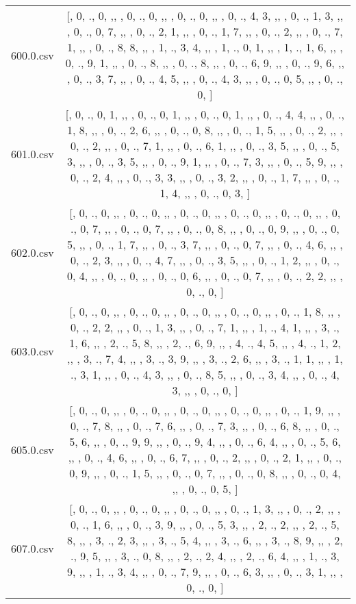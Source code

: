 \begin{table}[ht]
\begin{tabular}{@{}c c@{}}
	600.0.csv & [, 0, ., 0, ,,  , 0, ., 0, ,,  , 0, ., 0, ,,  , 0, ., 4, 3, ,,  , 0, ., 1, 3, ,,  , 0, ., 0, 7, ,,  , 0, ., 2, 1, ,,  , 0, ., 1, 7, ,,  , 0, ., 2, ,,  , 0, ., 7, 1, ,,  , 0, ., 8, 8, ,,  , 1, ., 3, 4, ,,  , 1, ., 0, 1, ,,  , 1, ., 1, 6, ,,  , 0, ., 9, 1, ,,  , 0, ., 8, ,,  , 0, ., 8, ,,  , 0, ., 6, 9, ,,  , 0, ., 9, 6, ,,  , 0, ., 3, 7, ,,  , 0, ., 4, 5, ,,  , 0, ., 4, 3, ,,  , 0, ., 0, 5, ,,  , 0, ., 0, ]\\ 
	601.0.csv & [, 0, ., 0, 1, ,,  , 0, ., 0, 1, ,,  , 0, ., 0, 1, ,,  , 0, ., 4, 4, ,,  , 0, ., 1, 8, ,,  , 0, ., 2, 6, ,,  , 0, ., 0, 8, ,,  , 0, ., 1, 5, ,,  , 0, ., 2, ,,  , 0, ., 2, ,,  , 0, ., 7, 1, ,,  , 0, ., 6, 1, ,,  , 0, ., 3, 5, ,,  , 0, ., 5, 3, ,,  , 0, ., 3, 5, ,,  , 0, ., 9, 1, ,,  , 0, ., 7, 3, ,,  , 0, ., 5, 9, ,,  , 0, ., 2, 4, ,,  , 0, ., 3, 3, ,,  , 0, ., 3, 2, ,,  , 0, ., 1, 7, ,,  , 0, ., 1, 4, ,,  , 0, ., 0, 3, ]\\ 
	602.0.csv & [, 0, ., 0, ,,  , 0, ., 0, ,,  , 0, ., 0, ,,  , 0, ., 0, ,,  , 0, ., 0, ,,  , 0, ., 0, 7, ,,  , 0, ., 0, 7, ,,  , 0, ., 0, 8, ,,  , 0, ., 0, 9, ,,  , 0, ., 0, 5, ,,  , 0, ., 1, 7, ,,  , 0, ., 3, 7, ,,  , 0, ., 0, 7, ,,  , 0, ., 4, 6, ,,  , 0, ., 2, 3, ,,  , 0, ., 4, 7, ,,  , 0, ., 3, 5, ,,  , 0, ., 1, 2, ,,  , 0, ., 0, 4, ,,  , 0, ., 0, ,,  , 0, ., 0, 6, ,,  , 0, ., 0, 7, ,,  , 0, ., 2, 2, ,,  , 0, ., 0, ]\\ 
	603.0.csv & [, 0, ., 0, ,,  , 0, ., 0, ,,  , 0, ., 0, ,,  , 0, ., 0, ,,  , 0, ., 1, 8, ,,  , 0, ., 2, 2, ,,  , 0, ., 1, 3, ,,  , 0, ., 7, 1, ,,  , 1, ., 4, 1, ,,  , 3, ., 1, 6, ,,  , 2, ., 5, 8, ,,  , 2, ., 6, 9, ,,  , 4, ., 4, 5, ,,  , 4, ., 1, 2, ,,  , 3, ., 7, 4, ,,  , 3, ., 3, 9, ,,  , 3, ., 2, 6, ,,  , 3, ., 1, 1, ,,  , 1, ., 3, 1, ,,  , 0, ., 4, 3, ,,  , 0, ., 8, 5, ,,  , 0, ., 3, 4, ,,  , 0, ., 4, 3, ,,  , 0, ., 0, ]\\ 
	605.0.csv & [, 0, ., 0, ,,  , 0, ., 0, ,,  , 0, ., 0, ,,  , 0, ., 0, ,,  , 0, ., 1, 9, ,,  , 0, ., 7, 8, ,,  , 0, ., 7, 6, ,,  , 0, ., 7, 3, ,,  , 0, ., 6, 8, ,,  , 0, ., 5, 6, ,,  , 0, ., 9, 9, ,,  , 0, ., 9, 4, ,,  , 0, ., 6, 4, ,,  , 0, ., 5, 6, ,,  , 0, ., 4, 6, ,,  , 0, ., 6, 7, ,,  , 0, ., 2, ,,  , 0, ., 2, 1, ,,  , 0, ., 0, 9, ,,  , 0, ., 1, 5, ,,  , 0, ., 0, 7, ,,  , 0, ., 0, 8, ,,  , 0, ., 0, 4, ,,  , 0, ., 0, 5, ]\\ 
	607.0.csv & [, 0, ., 0, ,,  , 0, ., 0, ,,  , 0, ., 0, ,,  , 0, ., 1, 3, ,,  , 0, ., 2, ,,  , 0, ., 1, 6, ,,  , 0, ., 3, 9, ,,  , 0, ., 5, 3, ,,  , 2, ., 2, ,,  , 2, ., 5, 8, ,,  , 3, ., 2, 3, ,,  , 3, ., 5, 4, ,,  , 3, ., 6, ,,  , 3, ., 8, 9, ,,  , 2, ., 9, 5, ,,  , 3, ., 0, 8, ,,  , 2, ., 2, 4, ,,  , 2, ., 6, 4, ,,  , 1, ., 3, 9, ,,  , 1, ., 3, 4, ,,  , 0, ., 7, 9, ,,  , 0, ., 6, 3, ,,  , 0, ., 3, 1, ,,  , 0, ., 0, ]\\ 

\end{tabular}
\end{table}
